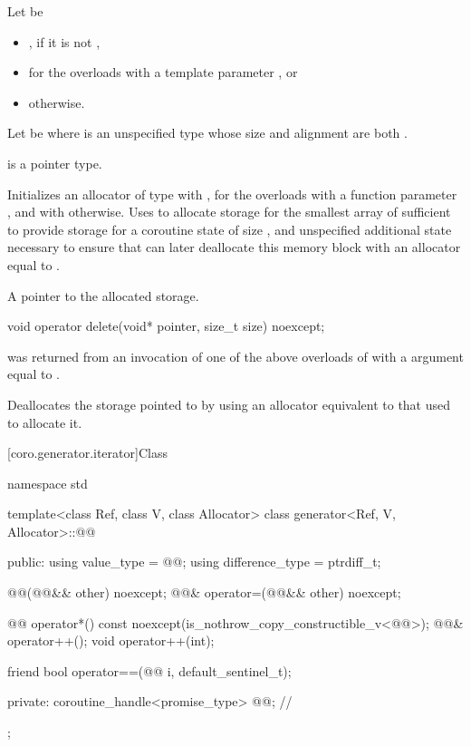 \begin{itemdescr}
\pnum
Let  be
\begin{itemize}
\item
{}, if it is not ,
\item
{} for the overloads with a template parameter , or
\item
{} otherwise.
\end{itemize}
Let  be 
where  is an unspecified type whose size and alignment
are both .

\pnum
\mandates
{} is a pointer type.

\pnum
\effects
Initializes an allocator  of type  with ,
for the overloads with a function parameter ,
and with  otherwise.
Uses  to allocate storage for the smallest array
of  sufficient to provide storage for
a coroutine state of size , and
unspecified additional state necessary to ensure that
 can later deallocate this memory block
with an allocator equal to .

\pnum
\returns
A pointer to the allocated storage.
\end{itemdescr}

%
\begin{itemdecl}
void operator delete(void* pointer, size_t size) noexcept;
\end{itemdecl}

\begin{itemdescr}
\pnum
\expects
{} was returned from an invocation of
one of the above overloads of 
with a  argument equal to .

\pnum
\effects
Deallocates the storage pointed to by 
using an allocator equivalent to that used to allocate it.
\end{itemdescr}

[coro.generator.iterator]{Class }

\begin{codeblock}
namespace std {
  template<class Ref, class V, class Allocator>
  class generator<Ref, V, Allocator>::@@ {
  public:
    using value_type = @@;
    using difference_type = ptrdiff_t;

    @@(@@&& other) noexcept;
    @@& operator=(@@&& other) noexcept;

    @@ operator*() const noexcept(is_nothrow_copy_constructible_v<@@>);
    @@& operator++();
    void operator++(int);

    friend bool operator==(@@ i, default_sentinel_t);

  private:
    coroutine_handle<promise_type> @@; // \expos
  };
}
\end{codeblock}

